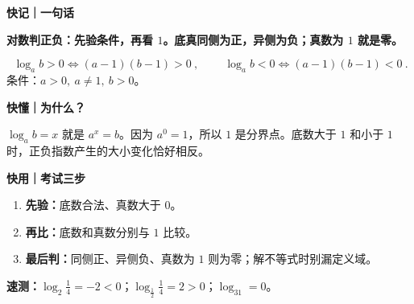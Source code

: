 \clearpage
\begin{summarybox}
  \textbf{\textcolor{CSummary}{快记｜一句话}}

  \textbf{对数判正负：先验条件，再看 $1$。底真同侧为正，异侧为负；真数为 $1$ 就是零。}

  \[
    \boxed{\ \log_a b>0\iff(a-1)(b-1)>0\ },\qquad
    \boxed{\ \log_a b<0\iff(a-1)(b-1)<0\ }.
  \]
  条件：$a>0,\ a\neq1,\ b>0$。

  \medskip
  \textbf{\textcolor{CSummary}{快懂｜为什么？}}

  $\log_a b=x$ 就是 $a^x=b$。因为 $a^0=1$，所以 $1$ 是分界点。底数大于 $1$ 和小于 $1$ 时，正负指数产生的大小变化恰好相反。
  \begin{center}
  
  \end{center}

  \textbf{\textcolor{CSummary}{快用｜考试三步}}
  \begin{enumerate}[leftmargin=*,itemsep=0.2em,topsep=0.2em]
    \item \textbf{先验：}底数合法、真数大于 $0$。
    \item \textbf{再比：}底数和真数分别与 $1$ 比较。
    \item \textbf{最后判：}同侧正、异侧负、真数为 $1$ 则为零；解不等式时别漏定义域。
  \end{enumerate}
  \textbf{速测：}$\log_2\frac14=-2<0$；$\log_{\frac12}\frac14=2>0$；$\log_31=0$。
\end{summarybox}
